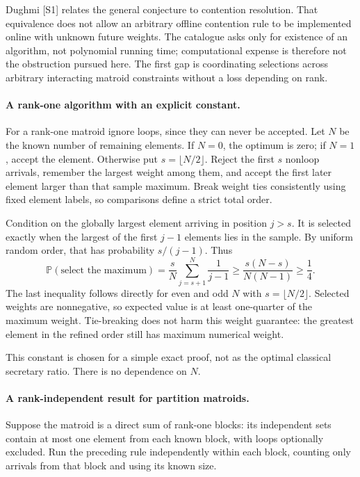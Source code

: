 \documentclass[11pt]{article}
\begin{document}
Dughmi [S1] relates the general conjecture to contention resolution. That equivalence does not allow an arbitrary offline contention rule to be implemented online with unknown future weights. The catalogue asks only for existence of an algorithm, not polynomial running time; computational expense is therefore not the obstruction pursued here. The first gap is coordinating selections across arbitrary interacting matroid constraints without a loss depending on rank.

\paragraph{A rank-one algorithm with an explicit constant.}
For a rank-one matroid ignore loops, since they can never be accepted. Let $N$ be the known number of remaining elements. If $N=0$, the optimum is zero; if $N=1$, accept the element. Otherwise put $s=\lfloor N/2\rfloor$. Reject the first $s$ nonloop arrivals, remember the largest weight among them, and accept the first later element larger than that sample maximum. Break weight ties consistently using fixed element labels, so comparisons define a strict total order.

Condition on the globally largest element arriving in position $j>s$. It is selected exactly when the largest of the first $j-1$ elements lies in the sample. By uniform random order, that has probability $s/(j-1)$. Thus
\[
 \mathbb P(\text{select the maximum})
 =\frac{s}{N}\sum_{j=s+1}^{N}\frac1{j-1}
 \ge\frac{s(N-s)}{N(N-1)}
 \ge\frac14.
 \tag{432.1}
\]
The last inequality follows directly for even and odd $N$ with $s=\lfloor N/2\rfloor$. Selected weights are nonnegative, so expected value is at least one-quarter of the maximum weight. Tie-breaking does not harm this weight guarantee: the greatest element in the refined order still has maximum numerical weight.

This constant is chosen for a simple exact proof, not as the optimal classical secretary ratio. There is no dependence on $N$.

\paragraph{A rank-independent result for partition matroids.}
Suppose the matroid is a direct sum of rank-one blocks: its independent sets contain at most one element from each known block, with loops optionally excluded. Run the preceding rule independently within each block, counting only arrivals from that block and using its known size.
\end{document}
